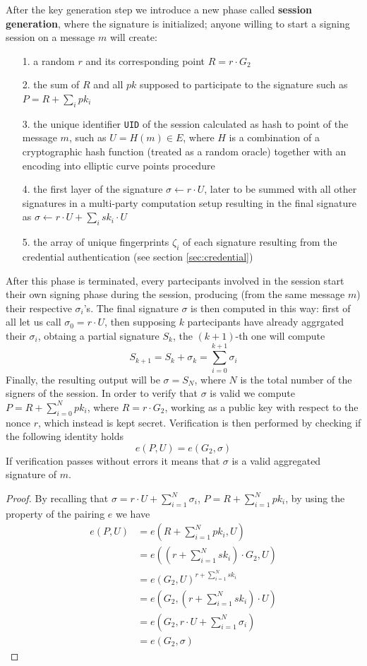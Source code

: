 \documentclass[twocolumn]{article}
\begin{document}
After the key generation step we introduce a new phase called \textbf{session generation}, where the signature is initialized; anyone willing to start a signing session on a message $m$ will create:
\begin{itemize}
    \item[1.] a random $r$ and its corresponding point $R = r\cdot G_2$
    \item[2.] the sum of $R$ and all $pk$ supposed to participate to the signature such as $P = R + \sum_i pk_i$
    \item[3.] the unique identifier \verb!UID! of the session calculated as hash to point of the message $m$, such as $U = H(m)\in E$, where $H$ is a combination of a cryptographic hash function (treated as a random oracle) together with an encoding into elliptic curve points procedure
    \item[4.] the first layer of the signature $\sigma \leftarrow r\cdot U$, later to be summed with all other signatures in a multi-party computation setup resulting in the final signature as $\sigma \leftarrow r\cdot U + \sum_i sk_i\cdot U$
    \item[5.] the array of unique fingerprints $\zeta_i$ of each signature resulting from the credential authentication (see section \ref{sec:credential}) 
\end{itemize}
After this phase is terminated, every partecipants involved in the session start their own signing phase during the session, producing (from the same message $m$) their respective $\sigma_i$'s. The final signature $\sigma$ is then computed in this way: first of all let us call $\sigma_0 = r\cdot U$, then supposing $k$ partecipants have already aggrgated their $\sigma_i$, obtaing a partial signature $S_k$, the $(k+1)$-th one will compute
\[
  S_{k+1}=S_k+\sigma_k = \sum_{i=0}^{k+1} \sigma_i
\]
Finally, the resulting output will be $\sigma = S_N$, where $N$ is the total number of the signers of the session. In order to verify that $\sigma$ is valid we compute $P = R + \sum_{i=0} ^N pk_i$, where $R = r\cdot G_2$, working as a public key with respect to the nonce $r$, which instead is kept secret. Verification is then performed by checking if the following identity holds
    \[ 
    e(P,U) = e(G_2,\sigma)
    \]
If verification passes without errors it means that $\sigma$ is a valid aggregated signature of $m$.
\begin{proof}
By recalling that $\sigma = r\cdot U + \sum_{i=1}^N \sigma_i$, $P = R + \sum_{i=1}^N pk_i$, by using the property of the pairing $e$ we have
\[
\begin{split}
    e(P,U)  &= e(R + \sum_{i=1}^N pk_i, U) \\
            &= e((r + \sum_{i=1}^N sk_i)\cdot G_2,U)\\
            &= e(G_2,U)^{r + \sum_{i=1}^N sk_i}\\
            &= e(G_2,(r + \sum_{i=1}^N sk_i)\cdot U) \\
            &= e(G_2,r\cdot U + \sum_{i=1}^N \sigma_i) \\
            &= e(G_2,\sigma)
\end{split}
\]
\end{proof} 
\end{document}
